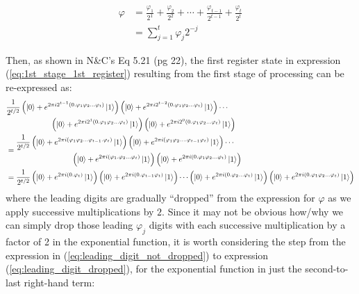 \documentclass{article}
\begin{document}
\begin{enumerate}[label=\textbf{(\arabic*)}]
\begin{align}
    \varphi
    &=
    \frac{\varphi_1}{2^1} + \frac{\varphi_2}{2^2}
    + \cdots + \frac{\varphi_{t-1}}{2^{t-1}}
    + \frac{\varphi_{t}}{2^{t}}\\
    &=
    \sum_{j=1}^{t} \varphi_{j} 2^{-j}
\end{align}

Then, as shown in N\&C's Eq 5.21 (pg 22), the first register state in expression (\ref{eq:1st_stage_1st_register}) resulting from the first stage of processing can be re-expressed as:
\begin{align}
&\begin{multlined}
    \frac{1}{2^{t/2}}\left(\ket{0}+e^{2\pi i 2^{t-1}(0.\varphi_1\varphi_2\ldots\varphi_{t})}\ket{1}\right)
      \left(\ket{0}+e^{2\pi i 2^{t-2}(0.\varphi_1\varphi_2\ldots\varphi_{t})}\ket{1}\right)
      \cdots\\
      \left(\ket{0}+e^{2\pi i 2^{1} (0.\varphi_{1}\varphi_2\ldots\varphi_{t})}\ket{1}\right)
      \left(\ket{0}+e^{2\pi i 2^0 (0.\varphi_1\varphi_2\ldots\varphi_{t})}\ket{1}\right)
\end{multlined}\\
&=
\begin{multlined}
    \frac{1}{2^{t/2}}\left(\ket{0}+e^{2\pi i (\varphi_1\varphi_2\ldots\varphi_{t-1}.\varphi_{t})}\ket{1}\right)
      \left(\ket{0}+e^{2\pi i (\varphi_1\varphi_2\ldots.\varphi_{t-1}\varphi_{t})}\ket{1}\right)
      \cdots\\
      \left(\ket{0}+e^{2\pi i (\varphi_{1}.\varphi_2\ldots\varphi_{t})}\ket{1}\right)
      \left(\ket{0}+e^{2\pi i (0.\varphi_1\varphi_2\ldots\varphi_{t})}\ket{1}\right)
\end{multlined}\label{eq:leading_digit_not_dropped}\\
&=
    \frac{1}{2^{t/2}}\left(\ket{0}+e^{2\pi i (0.\varphi_{t})}\ket{1}\right)
      \left(\ket{0}+e^{2\pi i (0.\varphi_{t-1}\varphi_{t})}\ket{1}\right)
      \cdots
      \left(\ket{0}+e^{2\pi i (0.\varphi_2\ldots\varphi_{t})}\ket{1}\right)
      \left(\ket{0}+e^{2\pi i (0.\varphi_1\varphi_2\ldots\varphi_{t})}\ket{1}\right)\label{eq:leading_digit_dropped}
\end{align}
where the leading digits are gradually ``dropped'' from the expression for $\varphi$ as we apply successive multiplications by $2$. Since it may not be obvious how/why we can simply drop those leading $\varphi_j$ digits with each successive multiplication by a factor of 2 in the exponential function, it is worth considering the step from the expression in (\ref{eq:leading_digit_not_dropped}) to expression (\ref{eq:leading_digit_dropped}), for the exponential function in just the second-to-last right-hand term:

\end{enumerate}
\end{document}
